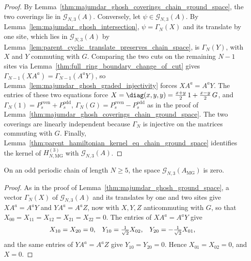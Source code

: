 \begin{proof}
    \leanok
    By Lemma~\ref{thm:majumdar_ghosh_coverings_chain_ground_space}, the two
    coverings lie in $\mathcal G_{N,3}(A)$. Conversely,
    let $\psi\in\mathcal G_{N,3}(A)$. By
    Lemma~\ref{lem:majumdar_ghosh_intersection}, $\psi=\Gamma_{N}(X)$ and its
    translate by one site, which lies in $\mathcal G_{N,3}(A)$ by
    Lemma~\ref{lem:parent_cyclic_translate_preserves_chain_space}, is
    $\Gamma_{N}(Y)$, with $X$ and $Y$ commuting with $G$. Comparing the two
    cuts on the remaining $N-1$ sites via
    Lemma~\ref{thm:full_ring_boundary_change_of_cut} gives
    $\Gamma_{N-1}(XA^a)=\Gamma_{N-1}(A^aY)$, so
    Lemma~\ref{lem:majumdar_ghosh_graded_injectivity} forces $XA^a=A^aY$. The
    entries of these two equations force
    $X=\diag(x,y,y)=\tfrac{x+y}2\,1+\tfrac{x-y}2\,G$, and
    $\Gamma_{N}(1)=P^{\mathrm{even}}_s+P^{\mathrm{odd}}_s$,
    $\Gamma_{N}(G)=P^{\mathrm{even}}_s-P^{\mathrm{odd}}_s$ as in the proof of
    Lemma~\ref{thm:majumdar_ghosh_coverings_chain_ground_space}. The two
    coverings are linearly independent because $\Gamma_{N}$ is injective on the
    matrices commuting with $G$. Finally,
    Lemma~\ref{thm:parent_hamiltonian_kernel_eq_chain_ground_space}
    identifies the kernel of $H_{N,\mathrm{MG}}^{(3)}$ with
    $\mathcal G_{N,3}(A)$.
\end{proof}

\begin{lemma}%
    \label{thm:majumdar_ghosh_ground_space_odd}
    \leanok
    On an odd periodic chain of length $N\ge5$, the space
    $\mathcal G_{N,3}(A_{\mathrm{MG}})$ is zero.
\end{lemma}

\begin{proof}
    \leanok
    As in the proof of Lemma~\ref{thm:majumdar_ghosh_ground_space}, a vector
    $\Gamma_{N}(X)$ of $\mathcal G_{N,3}(A)$ and its translates by one and two
    sites give $XA^a=A^aY$ and $YA^a=A^aZ$, now with $X,Y,Z$ anticommuting with
    $G$, so that $X_{00}=X_{11}=X_{12}=X_{21}=X_{22}=0$. The entries of
    $XA^a=A^aY$ give
    \begin{align}
        X_{10} & =X_{20}=0,
               &
        Y_{10} & =\tfrac1{\sqrt2}X_{02},
               &
        Y_{20} & =-\tfrac1{\sqrt2}X_{01},
        \notag
    \end{align}
    and the same entries of $YA^a=A^aZ$ give $Y_{10}=Y_{20}=0$. Hence
    $X_{01}=X_{02}=0$, and $X=0$.
\end{proof}

